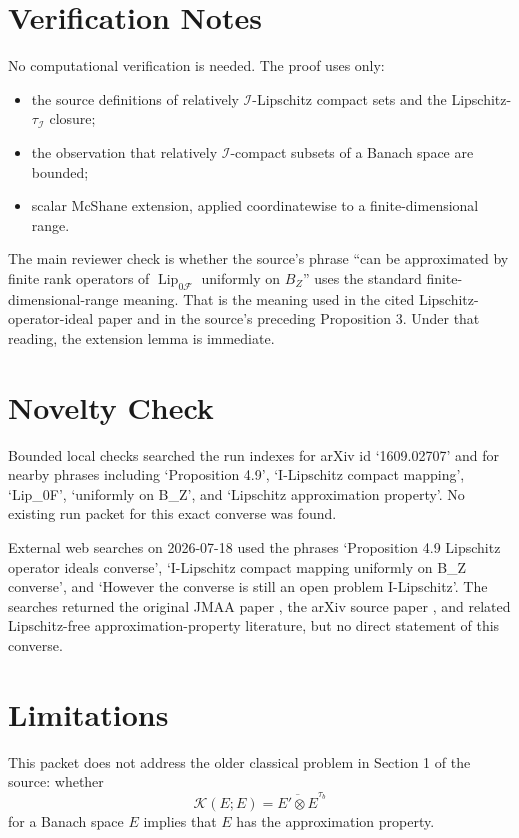 \documentclass[11pt]{article}
\newcommand{\Lip}{\operatorname{Lip}}
\begin{document}
\section*{Verification Notes}

No computational verification is needed.  The proof uses only:
\begin{itemize}
\item the source definitions of relatively \(\mathcal I\)-Lipschitz compact
sets and the Lipschitz-\(\tau_{\mathcal I}\) closure;
\item the observation that relatively \(\mathcal I\)-compact subsets of a
Banach space are bounded;
\item scalar McShane extension, applied coordinatewise to a finite-dimensional
range.
\end{itemize}

The main reviewer check is whether the source's phrase ``can be approximated
by finite rank operators of \(\Lip_{0\mathcal F}\) uniformly on \(B_Z\)''
uses the standard finite-dimensional-range meaning.  That is the meaning used
in the cited Lipschitz-operator-ideal paper and in the source's preceding
Proposition 3.  Under that reading, the extension lemma is immediate.

\section*{Novelty Check}

Bounded local checks searched the run indexes for arXiv id `1609.02707' and
for nearby phrases including `Proposition 4.9', `I-Lipschitz compact mapping',
`Lip\_0F', `uniformly on B\_Z', and `Lipschitz approximation property'.  No
existing run packet for this exact converse was found.

External web searches on 2026-07-18 used the phrases `Proposition 4.9
Lipschitz operator ideals converse', `I-Lipschitz compact mapping uniformly on
B\_Z converse', and `However the converse is still an open problem
I-Lipschitz'.  The searches returned the original JMAA paper
\cite{achour_rueda_sanchez_yahi}, the arXiv source paper
\cite{rueda_sanchez_perez}, and related Lipschitz-free approximation-property
literature, but no direct statement of this converse.

\section*{Limitations}

This packet does not address the older classical problem in Section 1 of the
source: whether
\[
  \mathcal K(E;E)=\overline{E'\otimes E}^{\tau_b}
\]
for a Banach space \(E\) implies that \(E\) has the approximation property.
\end{document}

